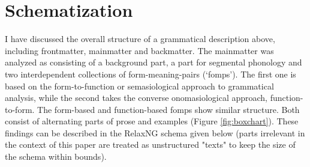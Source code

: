 \section{Schematization}
I have discussed the overall structure of a grammatical description above, including frontmatter, mainmatter and backmatter. The mainmatter was analyzed as consisting of a background part, a part for segmental phonology and two interdependent collections of form-meaning-pairs (`fomps'). The first one is based on the form-to-function or semasiological approach to grammatical analysis, while the second takes the converse onomasiological approach, function-to-form. The form-based and function-based fomps show similar structure. Both consist of alternating parts of prose and examples (Figure \ref{fig:boxchart}). These findings can be described in the RelaxNG schema given below (parts irrelevant in the context of this paper are treated as unstructured "texts" to keep the size of the schema within bounds).
\newpage
\footnotesize
\ea
